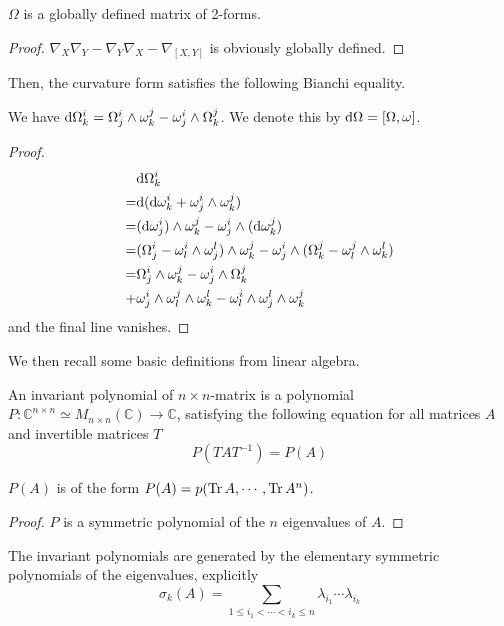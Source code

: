 	\begin{coro}
		$\Omega$ is a globally defined matrix of 2-forms. 
	\end{coro}
	\begin{proof}
		$\nabla_X\nabla_Y-\nabla_Y\nabla_X-\nabla_{[X,Y]}$ is obviously globally defined. 
	\end{proof}

	Then, the curvature form satisfies the following Bianchi equality. 
	\begin{thm}\label{Bianchi}
		We have $\mathrm{d}\Omega^i_k=\Omega^i_j\wedge\omega^j_k-\omega^i_j\wedge\Omega^j_k$. We denote this by $\mathrm{d}\Omega=[\Omega,\omega]$. 
	\end{thm}
	\begin{proof}
		\begin{align*}
			&\mathrm{d}\Omega^i_k \\
			=&\mathrm{d}(\mathrm{d}\omega^i_k+\omega^i_j\wedge\omega^j_k) \\
			=&(\mathrm{d}\omega^i_j)\wedge\omega^j_k - \omega^i_j\wedge(\mathrm{d}\omega^j_k) \\
			=&(\Omega^i_j-\omega^i_l\wedge\omega^l_j)\wedge\omega^j_k-\omega^i_j\wedge(\Omega^j_k-\omega^j_l\wedge\omega^l_k) \\
			=&\Omega^i_j\wedge\omega^j_k - \omega^i_j\wedge\Omega^j_k \\
			+&\omega^i_j\wedge\omega^j_l\wedge\omega^l_k - \omega^i_l\wedge\omega^l_j\wedge\omega^j_k
		\end{align*}
		and the final line vanishes. 
	\end{proof}

	We then recall some basic definitions from linear algebra. 
	\begin{defn}
		An invariant polynomial of $n\times n$-matrix is a polynomial $P:\mathbb{C}^{n\times n}\simeq M_{n\times n}(\mathbb{C})\to\mathbb{C}$, satisfying the following equation for all matrices $A$ and invertible matrices $T$
		\[ P(TAT^{-1})=P(A) \]
	\end{defn}
	\begin{thm}\label{Struct_inv_poly}
		$P(A)$ is of the form $P(A)=p(\operatorname{\mathrm{Tr}} A,\cdots,\operatorname{\mathrm{Tr}} A^n)$. 
	\end{thm}
	\begin{proof}
		$P$ is a symmetric polynomial of the $n$ eigenvalues of $A$. 
	\end{proof}
	\begin{coro}
		The invariant polynomials are generated by the elementary symmetric polynomials of the eigenvalues, explicitly 
		\[ \sigma_k(A)=\sum_{1\leq i_1<\cdots<i_k\leq n}\lambda_{i_1}\cdots\lambda_{i_k} \]
	\end{coro}

